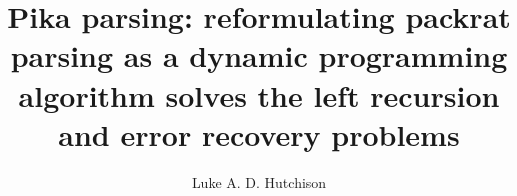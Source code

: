 \documentclass[manuscript,screen]{acmart}
\begin{document}
\title[Pika Parsing]{Pika parsing: reformulating packrat parsing as a dynamic programming algorithm solves the left recursion and error recovery problems}

\author{Luke A. D. Hutchison}

\end{document}
